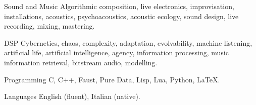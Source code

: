 

\begin{cvskills}

  \cvskill
    {Sound and Music} %
    {Algorithmic composition, live electronics, improvisation, installations, acoustics,
psychoacoustics, acoustic ecology, sound design, live recording, mixing, mastering.} %

  \cvskill
    {DSP} %
    {Cybernetics, chaos, complexity, adaptation, evolvability, machine listening, artificial life, artificial intelligence, agency, information processing, music information retrieval, bitstream audio, modelling.} %

  \cvskill
    {Programming} %
    {C, C++, Faust, Pure Data, Lisp, Lua, Python, LaTeX.} %

  \cvskill
    {Languages} %
    {English (fluent), Italian (native).} %

\end{cvskills}
